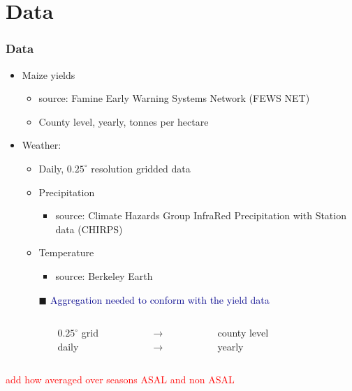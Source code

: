 \documentclass{beamer}              %
\begin{document}
\section{Data}
\begin{frame}\label{Data}
\frametitle{Data} 

\begin{itemize}
\item Maize yields
\begin{itemize}
\item source: Famine Early Warning Systems Network (FEWS NET)
\item County level, yearly, tonnes per hectare
\end{itemize}
\item Weather:
\begin{itemize}
\item Daily, $0.25^{\circ}$ resolution gridded data
\item Precipitation
	\begin{itemize}
	\item source: Climate Hazards Group InfraRed Precipitation with Station data (CHIRPS)
	\end{itemize}
\item Temperature
	\begin{itemize}
	\item source: Berkeley Earth
	\end{itemize}
	\item[$\blacksquare$] \textcolor{darkblue}{Aggregation needed to conform with the yield data}
	\end{itemize}

\end{itemize}

\begin{columns}
\footnotesize
	\begin{column}{0.4\textwidth}

	\end{column}
	\begin{column}{0.15\textwidth}
  		$0.25^{\circ}$ grid \\ daily
	\end{column}
	\begin{column}{0.05\textwidth}
  			$\rightarrow$ \\ $\rightarrow$
	\end{column}
	\begin{column}{0.25\textwidth} 
   		county level \\  yearly 
   	\end{column}
   		\begin{column}{0.4\textwidth} 
   		\end{column}
\end{columns}
\textcolor{red}{add how averaged over seasons ASAL and non ASAL}


\end{frame}
\end{document}
